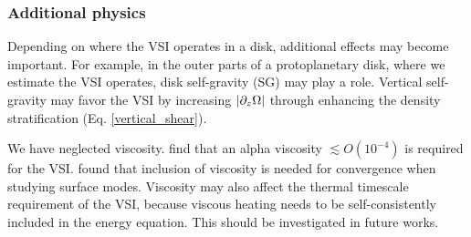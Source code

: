 \subsubsection{Additional physics} 
Depending on where the VSI operates in a
disk, additional effects may become important. For example, in the
outer parts of a protoplanetary disk, where we estimate the VSI 
operates, disk self-gravity (SG) may play a role. Vertical
self-gravity may favor the VSI by increasing $|\partial_z\Omega|$ through
enhancing the density stratification 
(Eq. \ref{vertical_shear}). %

We have neglected viscosity. \cite{nelson13} find that an alpha
viscosity $\lesssim O(10^{-4})$ is required for the
VSI. \cite{barker15} found that inclusion of viscosity is needed for 
convergence when studying surface modes. %
Viscosity may also affect the
thermal timescale requirement of the VSI, because viscous heating
needs to be self-consistently included in the energy equation. This
should be investigated in future works.   



